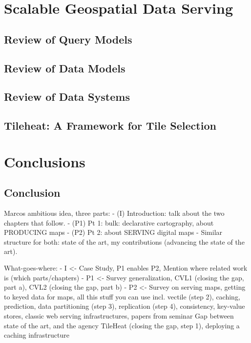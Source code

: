 \documentclass[11pt, oneside]{report}   	%
\begin{document}
\part{Scalable Geospatial Data Serving}
\chapter{Review of Query Models}
\chapter{Review of Data Models}
\chapter{Review of Data Systems}
\chapter{Tileheat: A Framework for Tile Selection}

\part{Conclusions}
\chapter{Conclusion}






Marcos ambitious idea, three parts:
- (I) Introduction: talk about the two chapters that follow. 
- (P1) Pt 1: bulk: declarative cartography, about PRODUCING maps
- (P2) Pt 2: about SERVING digital maps
- Similar structure for both: state of the art, my contributions (advancing the state of the art).  

What-goes-where:
- I <- Case Study, P1 enables P2, Mention where related work is (which parts/chapters)
- P1 <- 
        Survey generalization, 
        CVL1 (closing the gap, part a), 
        CVL2 (closing the gap, part b)
- P2 <- 
        Survey on serving maps, getting to keyed data for maps, all this stuff you can use 
                incl. vectile (step 2),
                caching,
                prediction,
                data partitioning (step 3), 
                replication (step 4), 
                consistency, 
                key-value stores, 
                classic web serving infrastructures,
                papers from seminar
        Gap between state of the art, and the agency
        TileHeat (closing the gap, step 1), deploying a caching infrastructure
        
\end{document}
